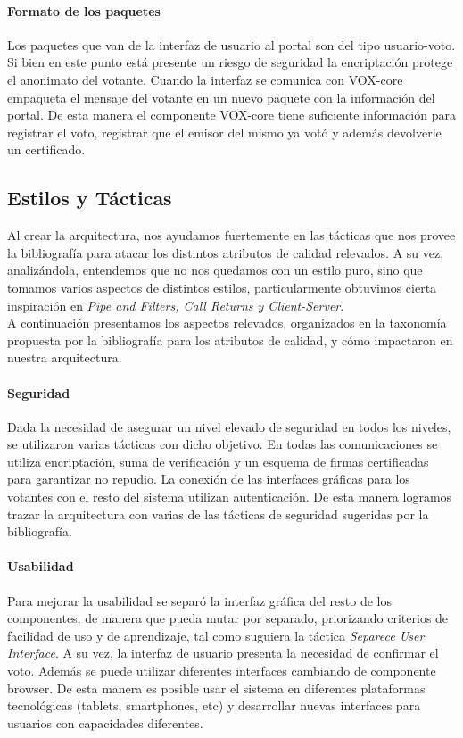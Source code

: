 \paragraph{Formato de los paquetes} Los paquetes que van de la interfaz de usuario al portal son del tipo usuario-voto. Si bien en este punto está presente un riesgo de seguridad la encriptación protege el anonimato del votante. Cuando la interfaz se comunica con VOX-core empaqueta el mensaje del votante en un nuevo paquete con la información del portal. De esta manera el componente VOX-core tiene suficiente información para registrar el voto, registrar que el emisor del mismo ya votó y además devolverle un certificado.


\subsection{Estilos y Tácticas}

Al crear la arquitectura, nos ayudamos fuertemente en las tácticas que nos provee la bibliografía para atacar los distintos atributos de calidad relevados. A su vez, analizándola, entendemos que no nos quedamos con un estilo puro, sino que tomamos varios aspectos de distintos estilos, particularmente obtuvimos cierta inspiración en \textit{Pipe and Filters, Call Returns y Client-Server}. \\ A continuación presentamos los aspectos relevados, organizados en la taxonomía propuesta por la bibliografía para los atributos de calidad, y cómo impactaron en nuestra arquitectura.
 


\paragraph{Seguridad}
Dada la necesidad de asegurar un nivel elevado de seguridad en todos los niveles, se utilizaron varias tácticas con dicho objetivo. En todas las comunicaciones se utiliza encriptación, suma de verificación y un esquema de firmas certificadas para garantizar no repudio. La conexión de las interfaces gráficas para los votantes con el resto del sistema utilizan autenticación. De esta manera logramos trazar la arquitectura con varias de las tácticas de seguridad sugeridas por la bibliografía.

\paragraph{Usabilidad}
Para mejorar la usabilidad se separó la interfaz gráfica del resto de los componentes, de manera que pueda mutar por separado, priorizando criterios de facilidad de uso y de aprendizaje, tal como suguiera la táctica \textit{Separece User Interface}. A su vez, la interfaz de usuario presenta la necesidad de confirmar el voto. Además se puede utilizar diferentes interfaces cambiando de componente browser. De esta manera es posible usar el sistema en diferentes plataformas tecnológicas (tablets, smartphones, etc) y desarrollar nuevas interfaces para usuarios con capacidades diferentes.

